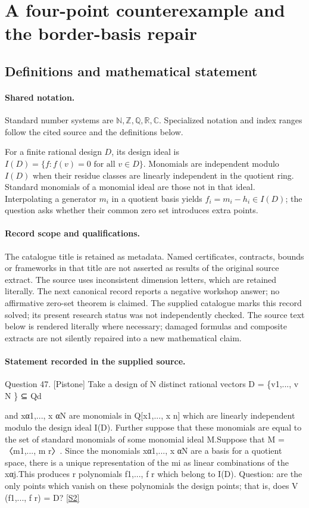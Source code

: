 \documentclass[11pt]{article}
\newcommand{\sref}[2]{\hyperlink{source:#1:#2}{[S#2]}}
\begin{document}
\section{A four-point counterexample and the border-basis repair}\label{statement}

\subsection{Definitions and mathematical statement}

\paragraph{Shared notation.}Standard number systems are $\mathbb N,\mathbb Z,\mathbb Q,\mathbb R,\mathbb C$. Specialized notation and index ranges follow the cited source and the definitions below.


For a finite rational design $D$, its design ideal is $I(D)=\{f:f(v)=0\text{ for all }v\in D\}$. Monomials are independent modulo $I(D)$ when their residue classes are linearly independent in the quotient ring. Standard monomials of a monomial ideal are those not in that ideal. Interpolating a generator $m_i$ in a quotient basis yields $f_i=m_i-h_i\in I(D)$; the question asks whether their common zero set introduces extra points.
\paragraph{Record scope and qualifications.}
The catalogue title is retained as metadata. Named certificates, contracts, bounds or frameworks in that title are not asserted as results of the original source extract.
The source uses inconsistent dimension letters, which are retained literally. The next canonical record reports a negative workshop answer; no affirmative zero-set theorem is claimed. The supplied catalogue marks this record solved; its present research status was not independently checked.
The source text below is rendered literally where necessary; damaged formulas and composite extracts are not silently repaired into a new mathematical claim.
\paragraph{Statement recorded in the supplied source.}
Question 47. [Pistone] Take a design of N distinct rational vectors D = \{v1,..., v N \} ⊆ Qd

and xα1,..., x αN are monomials in Q[x1,..., x n] which are linearly independent modulo the design ideal I(D). Further suppose that these monomials are equal to the set of standard monomials of some monomial ideal M.Suppose that M = 〈m1,..., m r〉. Since the monomials xα1,..., x αN are a basis for a quotient space, there is a unique representation of the mi as linear combinations of the xαj.This produces r polynomials f1,..., f r which belong to I(D). Question: are the only points which vanish on these polynomials the design points; that is, does V (f1,..., f r) = D? \sref{statement}{2}
\end{document}
